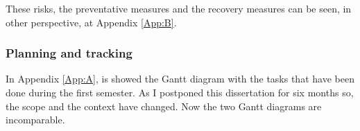 These risks, the preventative measures and the recovery measures can be seen, in other perspective, at Appendix \ref{App:B}.

\subsubsection{Planning and tracking}

In Appendix \ref{App:A}, is showed the Gantt diagram with the tasks that have been done during the first semester.
As I postponed this dissertation for six months so, the scope and the context have changed. Now the two Gantt diagrams are incomparable.



